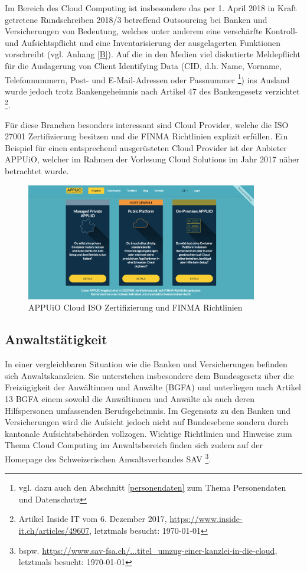 \documentclass[a4paper,pointlessnumbers]{scrreprt}
\begin{document}
Im Bereich des Cloud Computing ist insbesondere das per 1. April 2018 in Kraft getretene Rundschreiben 2018/3 betreffend Outsourcing bei Banken und Versicherungen von Bedeutung, welches unter anderem eine verschärfte Kontroll- und Aufsichtspflicht und eine Inventarisierung der ausgelagerten Funktionen vorschreibt (vgl. Anhang \ref{B}). Auf die in den Medien viel diskutierte Meldepflicht für die Auslagerung von Client Identifying Data (CID, d.h. Name, Vorname, Telefonnummern, Post- und E-Mail-Adressen oder Passnummer \footnote{vgl. dazu auch den Abschnitt \ref{personendaten} zum Thema Personendaten und Datenschutz}) ins Ausland wurde jedoch trotz Bankengeheimnis nach Artikel 47 des Bankengesetz verzichtet \footnote{Artikel Inside IT vom 6. Dezember 2017, \href{https://www.inside-it.ch/articles/49607}{https://www.inside-it.ch/articles/49607}, letztmals besucht: \today}.

Für diese Branchen besonders interessant sind Cloud Provider, welche die ISO 27001 Zertifizierung besitzen und die FINMA Richtlinien explizit erfüllen. Ein Beispiel für einen entsprechend ausgerüsteten Cloud Provider ist der Anbieter APPUiO, welcher im Rahmen der Vorlesung Cloud Solutions im Jahr 2017 näher betrachtet wurde.

\begin{figure}[H]
\begin{center}
\includegraphics[width=0.9\textwidth]{images/appuio_iso.pdf}
\caption{APPUiO Cloud ISO Zertifizierung und FINMA Richtlinien}
\end{center}
\end{figure}

\subsection{Anwaltstätigkeit}
In einer vergleichbaren Situation wie die Banken und Versicherungen befinden sich Anwaltskanzleien. Sie unterstehen insbesondere dem Bundesgesetz über die Freizügigkeit der Anwältinnen und Anwälte (BGFA) und unterliegen nach Artikel 13 BGFA einem sowohl die Anwältinnen und Anwälte als auch deren Hilfspersonen umfassenden Berufsgeheimnis. Im Gegensatz zu den Banken und Versicherungen wird die Aufsicht jedoch nicht auf Bundesebene sondern durch kantonale Aufsichtsbehörden vollzogen. Wichtige Richtlinien und Hinweise zum Thema Cloud Computing im Anwaltsbereich finden sich zudem auf der Homepage des Schweizerischen Anwaltsverbandes SAV \footnote{bspw. \href{https://www.sav-fsa.ch/de/anwaltsrecht/literatur/allgemeines.htm\#titel\_umzug-einer-kanzlei-in-die-cloud}{https://www.sav-fsa.ch/...titel\_umzug-einer-kanzlei-in-die-cloud}, letztmals besucht: \today}.
\end{document}

